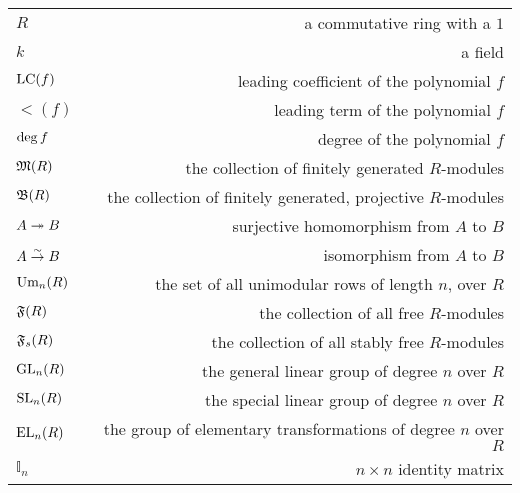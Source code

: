 \begin{tabular}{l r}
  $R$ & a commutative ring with a $1$            \\ 
  $k$ & a field                                  \\
  $\text{LC}(f)$ & leading coefficient of the polynomial $f$      \\
  $\lt(f)$ & leading term of the polynomial $f$              \\
  $\deg f$ & degree of the polynomial $f$            \\
  $\mathfrak M(R)$ & the collection of finitely generated $R$-modules \\
  $\mathfrak B(R)$ & the collection of finitely generated, projective $R$-modules \\
  $A \twoheadrightarrow B$ & surjective homomorphism from $A$ to $B$ \\
  $A \overset\sim\to B$ & isomorphism from $A$ to $B$ \\
  $\text{Um}_n(R)$ & the set of all unimodular rows of length $n$, over $R$ \\
  $\mathfrak F(R)$ & the collection of all free $R$-modules \\
  $\mathfrak{F}_s(R)$ & the collection of all stably free $R$-modules \\
  $\text{GL}_n(R)$ & the general linear group of degree $n$ over $R$ \\
  $\text{SL}_n(R)$ & the special linear group of degree $n$ over $R$ \\
  $\text{EL}_n(R)$ & the group of elementary transformations of degree $n$ over $R$ \\
  $\mathbb{I}_n$ & $n \times n$ identity matrix \\
\end{tabular}
